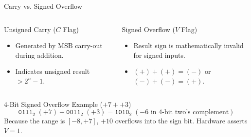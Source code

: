 \documentclass[aspectratio=169,11pt]{beamer}
\newcommand{\bits}[1]{\texttt{#1}}
\begin{document}
\begin{frame}{Carry vs. Signed Overflow}

\begin{columns}[T,onlytextwidth]

\begin{block}{Unsigned Carry ($C$ Flag)}
\begin{itemize}
  \item Generated by MSB carry-out during addition.
  \item Indicates unsigned result $> 2^n - 1$.
\end{itemize}
\end{block}

\begin{block}{Signed Overflow ($V$ Flag)}
\begin{itemize}
  \item Result sign is mathematically invalid for signed inputs.
  \item $(+) + (+) = (-)$ or $(-)+(-)=(+)$.
\end{itemize}
\end{block}

\end{columns}

\vspace{0.4em}

\begin{block}{4-Bit Signed Overflow Example ($+7 + +3$)}
$$\bits{0111}_2 \; (+7) + \bits{0011}_2 \; (+3) = \bits{1010}_2 \; (-6 \text{ in 4-bit two's complement})$$
Because the range is $[-8, +7]$, $+10$ overflows into the sign bit. Hardware asserts $V=1$.
\end{block}

\end{frame}

\end{document}
